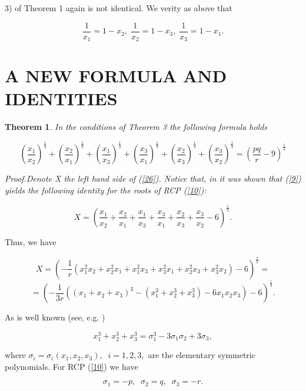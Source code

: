 \documentclass[12pt,oneside,english]{amsart}
\newtheorem{theorem}{Theorem}
\begin{document}
3) of Theorem 1 again is not identical. We verity as above that

$$
\frac{1}{x_1}=1-x_2, \;\frac{1}{x_2}= 1-x_3, \;\frac{1}{x_3}=1-x_1.
$$


\section{A NEW FORMULA AND IDENTITIES}\label{s4}

\begin{theorem}\label{thm4}
\slshape In the conditions of Theorem 3 the following formula
holds\upshape

\begin{equation}\label{26}
\left(\frac{x_1}{x_2}\right)^{\frac 1
3}+\left(\frac{x_2}{x_1}\right)^{\frac 1
3}+\left(\frac{x_1}{x_3}\right)^{\frac 1
3}+\left(\frac{x_3}{x_1}\right)^{\frac 1
3}+\left(\frac{x_2}{x_3}\right)^{\frac 1
3}+\left(\frac{x_3}{x_2}\right)^{\frac 1
3}=\left(\frac{pq}{r}-9\right)^{\frac 1 3}
\end{equation}

\end{theorem}

\slshape  Proof.\upshape Denote X the left hand side of (\ref{26}).
Notice that, in \cite{6} it was shown that (\ref{9}) yields the
following identity for the roots of RCP (\ref{10}):

\begin{equation}\label{27}
X=\left(\frac{x_1}{x_2}+\frac{x_2}{x_1}+\frac{x_1}{x_3}+\frac{x_3}{x_1}
+\frac{x_2}{x_3}+\frac{x_3}{x_2}-6\right)^{\frac 1 3}.
\end{equation}

Thus, we have
\newpage

$$
X=(-\frac 1 r
(x_1^2x_2+x_2^2x_1+x_1^2x_3+x_3^2x_1+x_2^2x_3+x_3^2x_2)-6)^\frac 1
3=
$$
\begin{equation}\label{28}
=(-\frac{1}{3r}((x_1+x_2+x_3)^3-(x_1^3+x_2^3+x_3^3)-6x_1x_2x_3)-6)^{\frac
1 3}.
\end    {equation}


As is well known (see, e.g. \cite{3})

\begin{equation}\label{29}
x_1^3+x_2^3+x_3^3=\sigma_1^3-3\sigma_1\sigma_2+3\sigma_3,
\end{equation}

where $\sigma_i=\sigma_i(x_1, x_2, x_3),\;\;i=1,2,3,$ are the
elementary symmetric polynomials. For RCP (\ref{10}) we have

\begin{equation}\label{30}
\sigma_1=-p,\;\;\sigma_2=q,\;\;\sigma_3=-r.
\end{equation}
\end{document}
